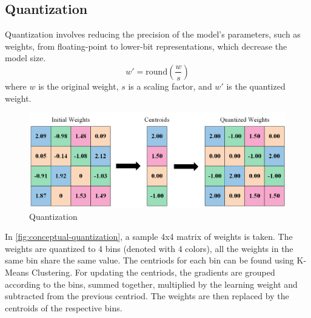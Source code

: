 \documentclass{ioereport}
\begin{document}
    \subsection{Quantization}
    Quantization involves reducing the precision of the model's parameters, such as weights, from floating-point to lower-bit representations, which decrease the model size.
    \begin{equation}
        w' = \text{round}\left(\frac{w}{s}\right)
    \end{equation}
    where \( w \) is the original weight, \( s \) is a scaling factor, and \( w' \) is the quantized weight.

    \begin{figure}[H]
            \centering
            \includegraphics[width=\linewidth]{assets/conceptual figure of quantization.png}
            \caption{Quantization}
            \label{fig:conceptual-quantization}
    \end{figure}
    In \autoref{fig:conceptual-quantization}, a sample 4x4 matrix of weights is taken. The weights are quantized to 4 bins (denoted with 4 colors),
    all the weights in the same bin share the same value. The centriods for each bin can be found using K-Means Clustering. For updating the centriods, the gradients  are grouped according to the bins, summed together, multiplied by the learning weight and subtracted from the previous centriod. The weights are then replaced by the centroids of the respective bins.
        
\end{document}
